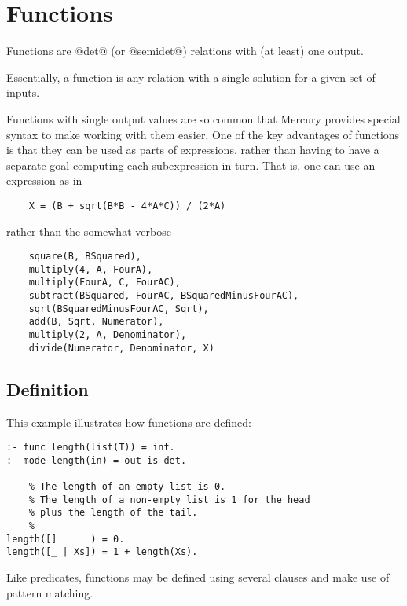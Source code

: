 \section{Functions}

Functions are @det@ (or @semidet@) relations with (at least) one output.

Essentially, a function is any relation with a single solution for
a given set of inputs.

Functions with single output values are so common that Mercury provides
special syntax to make working with them easier.  One of the key
advantages of functions is that they can be used as parts of
expressions, rather than having to have a separate goal computing each
subexpression in turn.  That is, one can use an expression as in
\begin{verbatim}
    X = (B + sqrt(B*B - 4*A*C)) / (2*A)
\end{verbatim}
rather than the somewhat verbose
\begin{verbatim}
    square(B, BSquared),
    multiply(4, A, FourA),
    multiply(FourA, C, FourAC),
    subtract(BSquared, FourAC, BSquaredMinusFourAC),
    sqrt(BSquaredMinusFourAC, Sqrt),
    add(B, Sqrt, Numerator),
    multiply(2, A, Denominator),
    divide(Numerator, Denominator, X)
\end{verbatim}

\subsection{Definition}

This example illustrates how functions are defined:
\begin{verbatim}
:- func length(list(T)) = int.
:- mode length(in) = out is det.

    % The length of an empty list is 0.
    % The length of a non-empty list is 1 for the head
    % plus the length of the tail.
    %
length([]      ) = 0.
length([_ | Xs]) = 1 + length(Xs).
\end{verbatim}
Like predicates, functions may be defined using several clauses
and make use of pattern matching.

